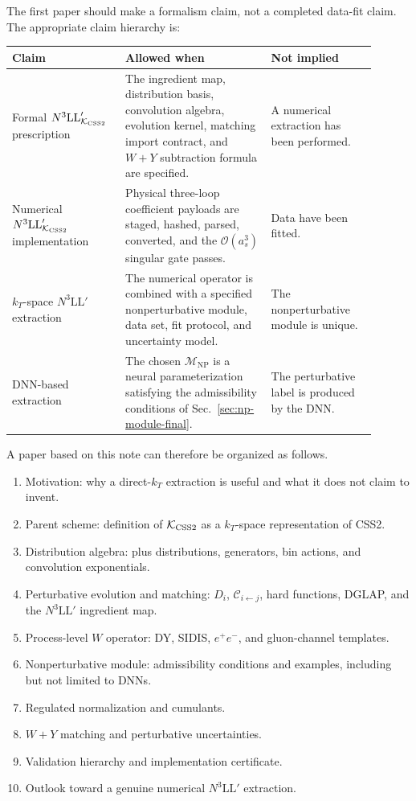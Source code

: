 \documentclass[11pt]{article}
\newcommand{\order}[1]{\mathcal{O}\!\left(#1\right)}
\newcommand{\NP}{\mathrm{NP}}
\newcommand{\KCSS}{\mathcal K_{\rm CSS2}}
\begin{document}
The first paper should make a formalism claim, not a completed data-fit claim.  The
appropriate claim hierarchy is:
\begin{center}
\begin{tabular}{p{0.28\linewidth} p{0.36\linewidth} p{0.26\linewidth}}
\toprule
Claim & Allowed when & Not implied \\
\midrule
Formal $N^3\mathrm{LL}'_{\KCSS}$ prescription
& The ingredient map, distribution basis, convolution algebra, evolution kernel, matching
import contract, and $W+Y$ subtraction formula are specified.
& A numerical extraction has been performed. \\
\addlinespace
Numerical $N^3\mathrm{LL}'_{\KCSS}$ implementation
& Physical three-loop coefficient payloads are staged, hashed, parsed, converted, and the
$\order{a_s^3}$ singular gate passes.
& Data have been fitted. \\
\addlinespace
$k_T$-space $N^3\mathrm{LL}'$ extraction
& The numerical operator is combined with a specified nonperturbative module, data set,
fit protocol, and uncertainty model.
& The nonperturbative module is unique. \\
\addlinespace
DNN-based extraction
& The chosen $\mathcal M_{\NP}$ is a neural parameterization satisfying the admissibility
conditions of Sec.~\ref{sec:np-module-final}.
& The perturbative label is produced by the DNN. \\
\bottomrule
\end{tabular}
\end{center}

A paper based on this note can therefore be organized as follows.
\begin{enumerate}
  \item Motivation: why a direct-$k_T$ extraction is useful and what it does not claim to
  invent.
  \item Parent scheme: definition of $\KCSS$ as a $k_T$-space representation of CSS2.
  \item Distribution algebra: plus distributions, generators, bin actions, and convolution
  exponentials.
  \item Perturbative evolution and matching: $D_i$, $\mathcal C_{i\leftarrow j}$, hard
  functions, DGLAP, and the $N^3\mathrm{LL}'$ ingredient map.
  \item Process-level $W$ operator: DY, SIDIS, $e^+e^-$, and gluon-channel templates.
  \item Nonperturbative module: admissibility conditions and examples, including but not
  limited to DNNs.
  \item Regulated normalization and cumulants.
  \item $W+Y$ matching and perturbative uncertainties.
  \item Validation hierarchy and implementation certificate.
  \item Outlook toward a genuine numerical $N^3\mathrm{LL}'$ extraction.
\end{enumerate}
\end{document}

